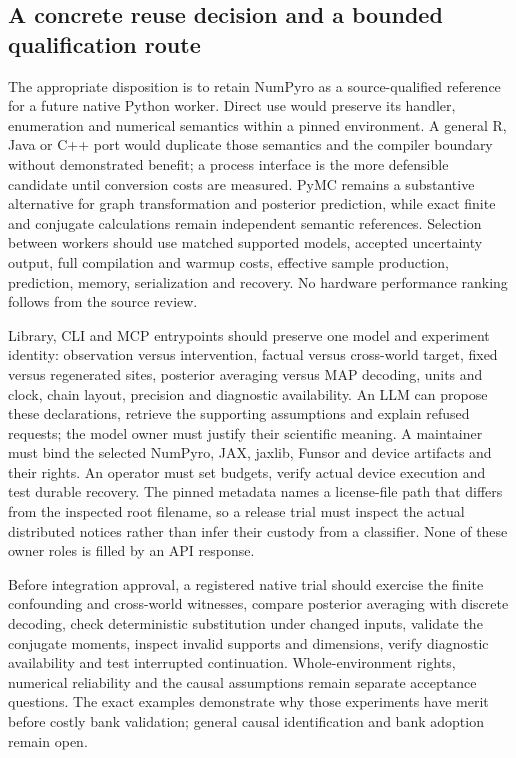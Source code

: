\subsection{A concrete reuse decision and a bounded qualification route}

The appropriate disposition is to retain NumPyro as a source-qualified reference for a future native Python worker. Direct use would preserve its handler, enumeration and numerical semantics within a pinned environment. A general R, Java or C++ port would duplicate those semantics and the compiler boundary without demonstrated benefit; a process interface is the more defensible candidate until conversion costs are measured. PyMC remains a substantive alternative for graph transformation and posterior prediction, while exact finite and conjugate calculations remain independent semantic references. Selection between workers should use matched supported models, accepted uncertainty output, full compilation and warmup costs, effective sample production, prediction, memory, serialization and recovery. No hardware performance ranking follows from the source review. \citep{exec23_numpyro_sources,exec23_pymc_sources,exec23_numpyro_reference}

Library, CLI and MCP entrypoints should preserve one model and experiment identity: observation versus intervention, factual versus cross-world target, fixed versus regenerated sites, posterior averaging versus MAP decoding, units and clock, chain layout, precision and diagnostic availability. An LLM can propose these declarations, retrieve the supporting assumptions and explain refused requests; the model owner must justify their scientific meaning. A maintainer must bind the selected NumPyro, JAX, jaxlib, Funsor and device artifacts and their rights. An operator must set budgets, verify actual device execution and test durable recovery. The pinned metadata names a license-file path that differs from the inspected root filename, so a release trial must inspect the actual distributed notices rather than infer their custody from a classifier. None of these owner roles is filled by an API response. \citep{exec23_numpyro_sources}

Before integration approval, a registered native trial should exercise the finite confounding and cross-world witnesses, compare posterior averaging with discrete decoding, check deterministic substitution under changed inputs, validate the conjugate moments, inspect invalid supports and dimensions, verify diagnostic availability and test interrupted continuation. Whole-environment rights, numerical reliability and the causal assumptions remain separate acceptance questions. The exact examples demonstrate why those experiments have merit before costly bank validation; general causal identification and bank adoption remain open. \citep{exec23_numpyro_sources,exec23_numpyro_reference}
